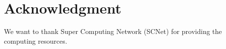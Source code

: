 \documentclass[conference]{IEEEtran}
\begin{document}
\section{Acknowledgment}
We want to thank Super Computing Network (SCNet) for providing the computing resources. 






\end{document}
